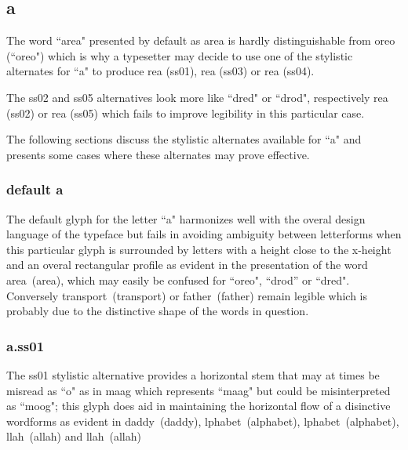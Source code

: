\subsection{a}

The word ``area" presented by default as {\ssdefault area} is hardly
distinguishable from {\ssdefault oreo} (``oreo") which is why a typesetter may
decide to use one of the stylistic alternates for ``a" to produce
{re{\ssone a}} (ss01),
{re{\ssthree a}} (ss03) or
{re{\ssfour a}} (ss04).

The ss02 and ss05 alternatives look more like ``dred" or ``drod", respectively
{re{\sstwo a}} (ss02) or
{re{\ssfive a}} (ss05)
which fails to improve legibility in this particular case.

The following sections discuss the stylistic alternates available for ``a" and
presents some cases where these alternates may prove effective.

\subsubsection{default {\ssdefault a}}

The default glyph for the letter ``a" harmonizes well with the overal design
language of the typeface but fails in avoiding ambiguity between letterforms
when this particular glyph is surrounded by letters with a height close to the
x-height and an overal rectangular profile as evident in the presentation of
the word \mbox{{\ssdefault area} (area)}, which may easily be confused
for ``oreo", ``drod'' or ``dred". Conversely
\mbox{{\ssdefault transport} (transport)} or
\mbox{{\ssdefault father} (father)} remain legible which is probably due to the
distinctive shape of the words in question.

\subsubsection{{\ssone a}.ss01}
The ss01 stylistic alternative provides a horizontal stem that may at times be
misread as ``o" as in \mbox{\ssdefault m{\ssone aa}g} which represents
``maag" but could be misinterpreted as ``moog"; this glyph does aid in
maintaining the horizontal flow of a disinctive wordforms as evident in
\mbox{{\ssdefault d{\ssone a}ddy} (daddy)},
\mbox{{lphabet} (alphabet)},
\mbox{{lph{\ssone a}bet} (alphabet)},
\mbox{{llah} (allah)} and
\mbox{{ll{\ssone a}h} (allah)}

